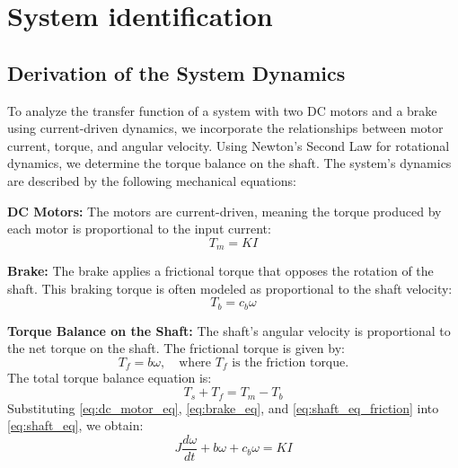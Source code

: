 \setcounter{secnumdepth}{2}

\chapter{System identification}
\label{section:identification}
\section{Derivation of the System Dynamics}

To analyze the transfer function of a system with two DC motors and a brake using current-driven dynamics, we 
incorporate the relationships between motor current, torque, and angular velocity. Using Newton's Second Law for 
rotational dynamics, we determine the torque balance on the shaft. The system's dynamics are described by the following 
mechanical equations:

\smallskip
\noindent \textbf{DC Motors:} The motors are current-driven, meaning the torque produced by each motor is 
proportional to the input current:
\begin{equation}
    T_m = K I
    \label{eq:dc_motor_eq}
\end{equation}

\smallskip
\noindent \textbf{Brake:} The brake applies a frictional torque that opposes the rotation of the shaft. This 
braking torque is often modeled as proportional to the shaft velocity:
\begin{equation}
    T_b = c_b \omega
    \label{eq:brake_eq}
\end{equation}

\smallskip
\noindent \textbf{Torque Balance on the Shaft:} The shaft's angular velocity is proportional to the net 
torque on the shaft. The frictional torque is given by:
\begin{equation}
    T_f = b \omega, \quad \text{where } T_f \text{ is the friction torque.}
    \label{eq:shaft_eq_friction}
\end{equation}
The total torque balance equation is:
\begin{equation}
    T_s + T_f = T_m - T_b
    \label{eq:shaft_eq}
\end{equation}
Substituting \eqref{eq:dc_motor_eq}, \eqref{eq:brake_eq}, and \eqref{eq:shaft_eq_friction} into \eqref{eq:shaft_eq}, we 
obtain:
\begin{equation}
    J \frac{d\omega}{dt} + b \omega + c_b \omega = K I
    \label{eq:shaft_eq_final}
\end{equation}

